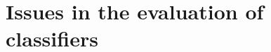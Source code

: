 \documentclass[\ifafour a4paper,12pt,\else a5paper,10pt,\fi%
onecolumn,oneside,article,%
british%
]{memoir}
\theoremstyle{remark}
\theoremstyle{innote}
\renewcommand*{\|}[1][]{\nonscript\:#1\vert\nonscript\:\mathopen{}}
\begin{document}



\section{Issues in the evaluation of classifiers}
\label{sec:issues}
\end{document}
